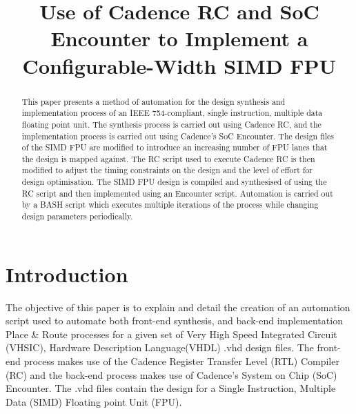 \documentclass[conference]{IEEEtran}
\begin{document}
\title{Use of Cadence RC and SoC Encounter to Implement a Configurable-Width SIMD FPU}



\author{
}

\maketitle

\begin{abstract}
	
This paper presents a method of automation for the design synthesis and implementation process of an IEEE 754-compliant, single instruction, multiple data floating point unit. The synthesis process is carried out using Cadence RC, and the implementation process is carried out using Cadence's SoC Encounter. The  design files of the SIMD FPU are modified to introduce an increasing number of FPU lanes that the design is mapped against. The RC script used to execute Cadence RC is then modified to adjust the timing constraints on the design and the level of effort for design optimisation. The SIMD FPU design is compiled and synthesised of using the RC script and then implemented using an Encounter script. Automation  is carried out by a BASH script which executes multiple iterations of the process while changing design parameters periodically.  
\end{abstract}

\IEEEpeerreviewmaketitle

\section{Introduction}

The objective of this paper is to explain and detail the creation of an automation script used to automate both front-end synthesis, and back-end implementation Place \& Route processes for a given set of Very High Speed Integrated Circuit (VHSIC), Hardware Description Language(VHDL) .vhd design files. The front-end process makes use of the Cadence Register Transfer Level (RTL) Compiler (RC) and the back-end process makes use of Cadence's System on Chip (SoC) Encounter. The .vhd files contain the design for a Single Instruction, Multiple Data (SIMD) Floating point Unit (FPU). 
\newline
\end{document}
